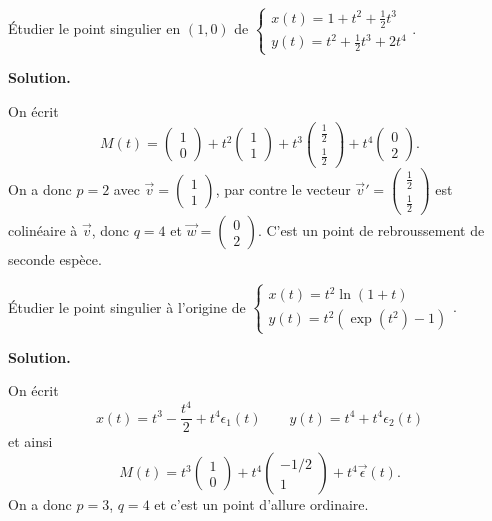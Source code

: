 \documentclass[class=report,crop=false]{standalone}
\begin{document}
\begin{exemple}
Étudier le point singulier en $(1,0)$ de
$\left\{\begin{array}{l} x(t) = 1+t^2+\frac12t^3 \\ y(t) = t^2 + \frac12t^3 + 2t^4 \end{array}\right..$

\medskip
\textbf{Solution.}

On écrit
$$M(t) = \begin{pmatrix}1\\0\end{pmatrix}
+ t^2 \begin{pmatrix}1\\1\end{pmatrix}
+ t^3 \begin{pmatrix}\frac12\\\frac12\end{pmatrix}
+ t^4 \begin{pmatrix}0\\2\end{pmatrix}.$$
On a donc $p=2$ avec $\vec{v}=\left(\begin{smallmatrix}1\\1\end{smallmatrix}\right)$,
par contre le vecteur $\vec{v}'=\left(\begin{smallmatrix}\frac12\\\frac12\end{smallmatrix}\right)$
est colinéaire à $\vec{v}$, donc $q=4$ et
$\vec{w}=\left(\begin{smallmatrix}0\\2\end{smallmatrix}\right)$.
C'est un point de rebroussement de seconde espèce.


\end{exemple}



\begin{exemple}
Étudier le point singulier à l'origine de
$\left\{\begin{array}{l} x(t) = t^2\ln(1+t) \\ y(t) = t^2\left(\exp(t^2) -1\right) \end{array}\right..$

\medskip
\textbf{Solution.}

On écrit
$$x(t) = t^3 - \frac{t^4}{2} + t^4 \epsilon_1(t)
\qquad
y(t) = t^4 + t^4 \epsilon_2(t)$$
et ainsi
$$M(t) =  t^3 \begin{pmatrix}1\\0\end{pmatrix} + t^4
\begin{pmatrix}-1/2\\1\end{pmatrix}+t^4 \vec{\epsilon}(t).$$
On a donc $p=3$, $q=4$ et c'est un point d'allure ordinaire.


\end{exemple}
\end{document}
